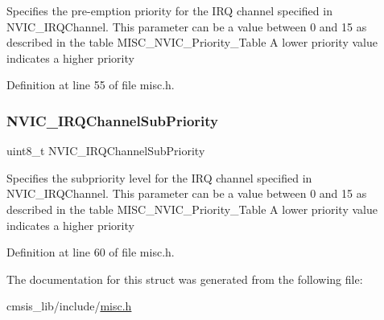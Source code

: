 Specifies the pre-\/emption priority for the I\+RQ channel specified in N\+V\+I\+C\+\_\+\+I\+R\+Q\+Channel. This parameter can be a value between 0 and 15 as described in the table M\+I\+S\+C\+\_\+\+N\+V\+I\+C\+\_\+\+Priority\+\_\+\+Table A lower priority value indicates a higher priority 

Definition at line 55 of file misc.\+h.

\mbox{\label{struct_n_v_i_c___init_type_def_a91b24559ddbc12752f2414582fb47cb9}} 
\subsubsection{\texorpdfstring{N\+V\+I\+C\+\_\+\+I\+R\+Q\+Channel\+Sub\+Priority}{NVIC\_IRQChannelSubPriority}}
{\footnotesize\ttfamily uint8\+\_\+t N\+V\+I\+C\+\_\+\+I\+R\+Q\+Channel\+Sub\+Priority}

Specifies the subpriority level for the I\+RQ channel specified in N\+V\+I\+C\+\_\+\+I\+R\+Q\+Channel. This parameter can be a value between 0 and 15 as described in the table M\+I\+S\+C\+\_\+\+N\+V\+I\+C\+\_\+\+Priority\+\_\+\+Table A lower priority value indicates a higher priority 

Definition at line 60 of file misc.\+h.



The documentation for this struct was generated from the following file\+:\begin{DoxyCompactItemize}
\item 
cmsis\+\_\+lib/include/\hyperlink{misc_8h}{misc.\+h}\end{DoxyCompactItemize}
